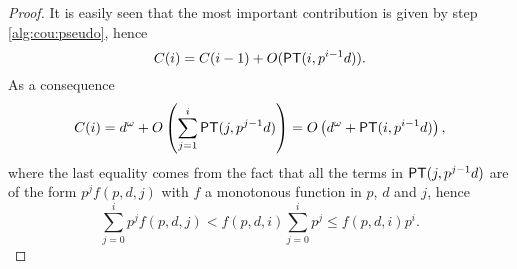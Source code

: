 \begin{proof}
  It is easily seen that the most important contribution is given by
  step \ref{alg:cou:pseudo}, hence
  \[C(i) = C(i-1) + O(\mathrm{\sf PT}(i,p^{i-1}d))\text{.}\]
  As a consequence
  \begin{equation*}
    C(i) = d^\omega + O\left(\sum_{j=1}^i\mathrm{\sf PT}(j,p^{j-1}d)\right) =
    O\left(d^\omega + \mathrm{\sf PT}(i,p^{i-1}d)\right)
    \text{,}
  \end{equation*}
  where the last equality comes from the fact that all the terms in
  $\mathrm{\sf PT}(j,p^{j-1}d)$ are of the form $p^jf(p,d,j)$ with $f$ a
  monotonous function in $p$, $d$ and $j$, hence
  \begin{equation*}
    \sum_{j=0}^i p^jf(p,d,j) < f(p,d,i)\sum_{j=0}^ip^j \le f(p,d,i)p^i
    \text{.}
  \end{equation*}
\end{proof}



%
